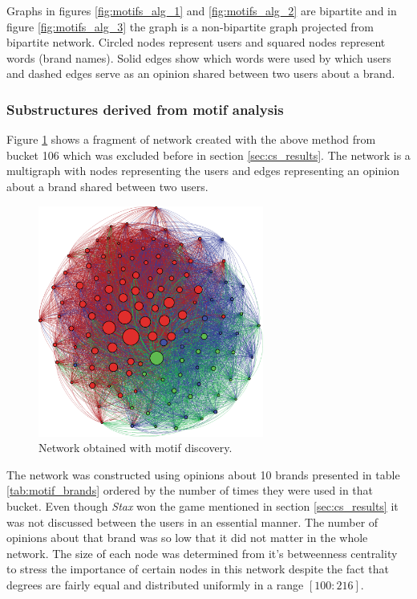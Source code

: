       Graphs in figures \ref{fig:motifs_alg_1} and \ref{fig:motifs_alg_2} are bipartite and in figure \ref{fig:motifs_alg_3} the graph is a non-bipartite graph projected from bipartite network. Circled nodes represent users and squared nodes represent words (brand names). Solid edges show which words were used by which users and dashed edges serve as an opinion shared between two users about a brand.
      
    \subsubsection{Substructures derived from motif analysis}
      
      Figure \ref{fig:motif_network} shows a fragment of network created with the above method from bucket 106 which was excluded before in section \ref{sec:cs_results}. The network is a multigraph with nodes representing the users and edges representing an opinion about a brand shared between two users.
      \begin{figure}[b!]
        \centering
        \includegraphics[width=0.66\textwidth]{chapters/03_implementation/motif_network}
        \caption{Network obtained with motif discovery.}
        \label{fig:motif_network}
      \end{figure}
      
      The network was constructed using opinions about 10 brands presented in table \ref{tab:motif_brands} ordered by the number of times they were used in that bucket. Even though \emph{Stax} won the game mentioned in section \ref{sec:cs_results} it was not discussed between the users in an essential manner. The number of opinions about that brand was so low that it did not matter in the whole network. The size of each node was determined from it's betweenness centrality to stress the importance of certain nodes in this network despite the fact that degrees are fairly equal and distributed uniformly in a range $[100:216]$.
      

